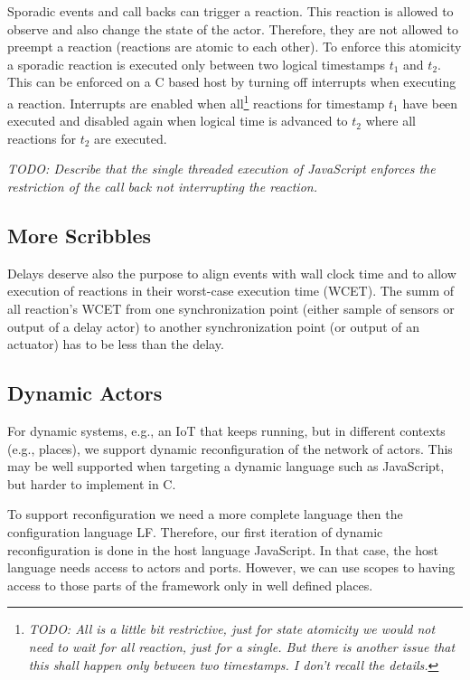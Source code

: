 \documentclass[sigconf]{acmart}
\newcommand{\todo}[1]{{\emph{TODO: #1}}}
\begin{document}
Sporadic events and call backs can trigger a reaction. This reaction is allowed
to observe and also change the state of the actor. Therefore, they are not allowed
to preempt a reaction (reactions are atomic to each other). To enforce this atomicity
a sporadic reaction is executed only between two logical timestamps $t_1$ and $t_2$.
This can be enforced on a C based host by turning off interrupts when executing
a reaction. Interrupts are enabled when all\footnote{\todo{All is a little bit restrictive,
just for state atomicity we would not need to wait for all reaction, just for a single.
But there is another issue that this shall happen only between two timestamps.
I don't recall the details.}}
reactions for timestamp $t_1$ have been executed and disabled again when logical
time is advanced to $t_2$ where all reactions for $t_2$ are executed.


\todo{Describe that the single threaded execution of JavaScript enforces
the restriction of the call back not interrupting the reaction.}

\subsection{More Scribbles}

Delays deserve also the purpose to align events with wall clock time and to
allow execution of reactions in their worst-case execution time (WCET).
The summ of all reaction's WCET from one synchronization point (either
sample of sensors or output of a delay actor) to another synchronization
point (or output of an actuator) has to be less than the delay.

\subsection{Dynamic Actors}

For dynamic systems, e.g., an IoT that keeps running, but in different contexts
(e.g., places), we support dynamic reconfiguration of the network of actors.
This may be well supported when targeting a dynamic language such as JavaScript,
but harder to implement in C.

To support reconfiguration we need a more complete language then the configuration
language LF. Therefore, our first iteration of dynamic reconfiguration is done in the
host language JavaScript. In that case, the host language needs access to actors and
ports. However, we can use scopes to having access to those parts of the framework
only in well defined places.
\end{document}
